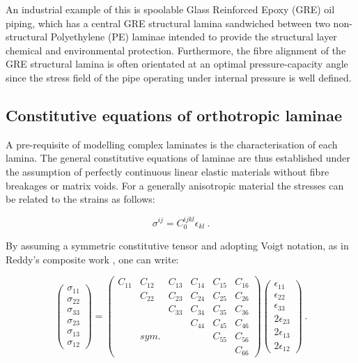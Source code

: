 An industrial example of this is spoolable Glass Reinforced Epoxy (GRE) oil piping, which has a central GRE structural lamina sandwiched between two non-structural Polyethylene (PE) laminae intended to provide the structural layer chemical and environmental protection. Furthermore, the fibre alignment of the GRE structural lamina is often orientated at an optimal pressure-capacity angle since the stress field of the pipe operating under internal pressure is well defined.

\subsection{Constitutive equations of orthotropic laminae}

A pre-requisite of modelling complex laminates is the characterisation of each lamina. The general constitutive equations of laminae are thus established under the assumption of perfectly continuous linear elastic materials without fibre breakages or matrix voids. For a generally anisotropic material the stresses can be related to the strains as follows:

\begin{equation} 
\sigma^{ij} = C_0^{ijkl} \epsilon_{kl}
\label{eqscomp1}\ .
\end{equation}

By assuming a symmetric constitutive tensor and adopting Voigt notation, as in Reddy's composite work \cite{reddy2004mechanics}, one can write:

\begin{equation} 
\begin{pmatrix}
\sigma_{11} \\
\sigma_{22} \\
\sigma_{33} \\
\sigma_{23} \\
\sigma_{13} \\
\sigma_{12}
\end{pmatrix}
=
\begin{pmatrix}
C_{11} & C_{12} & C_{13} & C_{14} & C_{15} & C_{16} \\
\  & C_{22} & C_{23} & C_{24} & C_{25} & C_{26} \\
\  & \  & C_{33} & C_{34} & C_{35} & C_{36} \\
\  & \  & \  & C_{44} & C_{45} & C_{46} \\
\  & sym. & \  & \ & C_{55} & C_{56} \\
\  & \  & \  & \  & \  & C_{66}
\end{pmatrix}
\begin{pmatrix}
\epsilon_{11} \\
\epsilon_{22} \\
\epsilon_{33} \\
2\epsilon_{23} \\
2\epsilon_{13} \\
2\epsilon_{12}
\end{pmatrix}
\label{eqscomp2}\ .
\end{equation}

